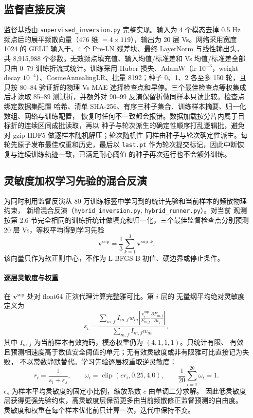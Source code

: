 \documentclass[UTF8,a4paper,11pt]{ctexart}
\begin{document}
\subsection{监督直接反演}
监督基线由 \texttt{supervised\_inversion.py} 完整实现。输入为 4 个模态去掉 0.5 Hz
频点后的展平频散向量（476 维 \(=4\times119\)），输出为 20 层 Vs。网络采用宽度
1024 的 GELU 输入干、4 个 Pre-LN 残差块、最终 LayerNorm 与线性输出头，共
8{,}915{,}988 个参数。无效频点填充值、输入均值/标准差和 Vs 均值/标准差全部只由
0--79 训练折流式统计。训练采用 Huber 损失、AdamW（lr \(10^{-3}\)，weight decay
\(10^{-4}\)）、CosineAnnealingLR、批量 8192；种子 0、1、2 各至多 150 轮，且只按
80--84 验证折的物理 Vs MAE 选择检查点和早停。三个最佳检查点等权集成后才读取
85--89 测试折，并额外对 90--99 反演保留折做同样本只读比较。检查点绑定数据集配置
哈希、清单 SHA-256、有序三种子集合、训练样本摘要、归一化数组、网络与训练配置，
恢复时任何不一致都会报错。数据加载按分片内属于目标折的连续区间成批读取，再以
种子与轮次派生的确定性顺序打乱逻辑批，避免对 gzip HDF5 做逐样本随机解压；轮次随机性
同样由种子与轮次确定性派生。每轮先原子发布最佳权重和历史，最后以
\texttt{last.pt} 作为轮次提交标记，因此中断恢复与连续训练轨迹一致，已满足耐心阈值
的种子再次运行也不会额外训练。

\subsection{灵敏度加权学习先验的混合反演}\label{sec:hybrid-method}
为同时利用监督反演从 80 万训练标签中学习到的统计先验和当前样本的频散物理约束，
新增混合反演（\texttt{hybrid\_inversion.py}, \texttt{hybrid\_runner.py}）。对当前
观测按第 2.6 节完全相同的训练折统计做填充和归一化，三个最佳监督检查点分别预测
20 层 Vs，等权平均得到学习先验
\begin{equation}
\mathbf v^{\mathrm{sup}}=\frac{1}{3}\sum_{k=1}^{3}
\mathbf v^{\mathrm{sup},k}.
\end{equation}
该向量只作为软正则中心，不作为 L-BFGS-B 初值、硬边界或停止条件。

\paragraph{逐层灵敏度与权重}
在 \(\mathbf v^{\mathrm{sup}}\) 处对 float64 正演代理计算完整雅可比。第 \(i\) 层的
无量纲平均绝对灵敏度定义为
\begin{equation}
s_i=\frac{\displaystyle\sum_{m,f}I_{m,f}w_m
\left|\frac{v_i^{\mathrm{sup}}}{F_{m,f}}
\frac{\partial F_{m,f}}{\partial v_i}\right|}
{\displaystyle\sum_{m,f}I_{m,f}w_m},
\end{equation}
其中 \(I_{m,f}\) 为当前样本有效掩码，模态权重仍为 \((4,1,1,1)\)。只统计有限、
有效且预测相速度高于数值安全阈值的单元；无有效灵敏度或非有限雅可比直接记为失败，
不以常数静默替代。学习先验逐层权重取逆灵敏度：
\begin{equation}
r_i=\frac{1}{s_i+\epsilon_s},\qquad
\omega_i=\operatorname{clip}(c r_i,0.25,4.0),\qquad
\frac{1}{20}\sum_{i=1}^{20}\omega_i=1.
\end{equation}
\(\epsilon_s\) 为样本平均灵敏度的固定小比例，缩放系数 \(c\) 由单调二分求解。
因此低灵敏度层获得更强先验约束，高灵敏度层保留更多由当前频散修正监督预测的自由度。
灵敏度和权重在每个样本优化前只计算一次，迭代中保持不变。
\end{document}
